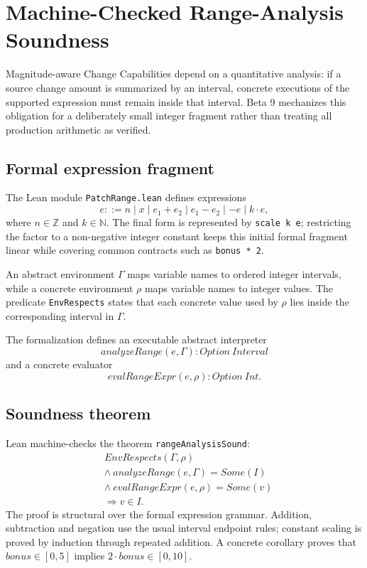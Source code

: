 \section{Machine-Checked Range-Analysis Soundness}

Magnitude-aware Change Capabilities depend on a quantitative analysis: if a
source change amount is summarized by an interval, concrete executions of the
supported expression must remain inside that interval. Beta 9 mechanizes this
obligation for a deliberately small integer fragment rather than treating all
production arithmetic as verified.

\subsection{Formal expression fragment}
The Lean module \texttt{PatchRange.lean} defines expressions
\[
e ::= n \mid x \mid e_1 + e_2 \mid e_1 - e_2 \mid -e \mid k \cdot e,
\]
where $n\in\mathbb{Z}$ and $k\in\mathbb{N}$. The final form is represented by
\texttt{scale k e}; restricting the factor to a non-negative integer constant
keeps this initial formal fragment linear while covering common contracts such
as \texttt{bonus * 2}.

An abstract environment $\Gamma$ maps variable names to ordered integer
intervals, while a concrete environment $\rho$ maps variable names to integer
values. The predicate \texttt{EnvRespects} states that each concrete value used
by $\rho$ lies inside the corresponding interval in $\Gamma$.

The formalization defines an executable abstract interpreter
\[
\mathit{analyzeRange}(e,\Gamma) : Option\ Interval
\]
and a concrete evaluator
\[
\mathit{evalRangeExpr}(e,\rho) : Option\ Int.
\]

\subsection{Soundness theorem}
Lean machine-checks the theorem \texttt{rangeAnalysisSound}:
\[
\begin{split}
&EnvRespects(\Gamma,\rho) \\
&\land\ analyzeRange(e,\Gamma)=Some(I) \\
&\land\ evalRangeExpr(e,\rho)=Some(v) \\
&\Longrightarrow v\in I.
\end{split}
\]
The proof is structural over the formal expression grammar. Addition,
subtraction and negation use the usual interval endpoint rules; constant scaling
is proved by induction through repeated addition. A concrete corollary proves
that $bonus\in[0,5]$ implies $2\cdot bonus\in[0,10]$.

